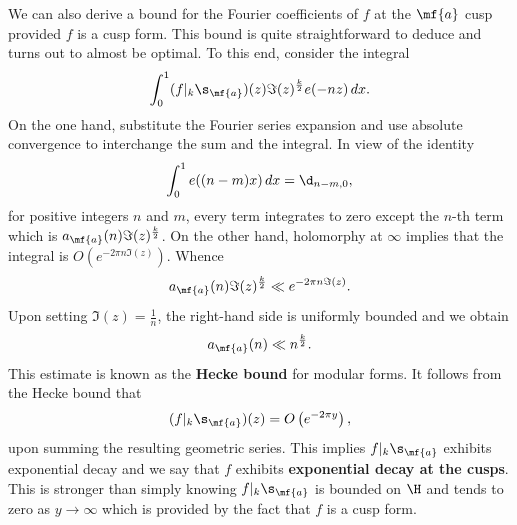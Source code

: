 \documentclass[12pt]{article}
\begin{document}
      We can also derive a bound for the Fourier coefficients of \(f\) at the \(\mf{a}\) cusp provided \(f\) is a cusp form. This bound is quite straightforward to deduce and turns out to almost be optimal. To this end, consider the integral
      \[
        \int_{0}^{1}(f|_{k}\s_{\mf{a}})(z)\Im(z)^{\frac{k}{2}}e(-nz)\,dx.
      \]
      On the one hand, substitute the Fourier series expansion and use absolute convergence to interchange the sum and the integral. In view of the identity
      \begin{equation}\label{equ:Dirac_integral_representation}
        \int_{0}^{1}e((n-m)x)\,dx = \d_{n-m,0},
      \end{equation}
      for positive integers \(n\) and \(m\), every term integrates to zero except the \(n\)-th term which is \(a_{\mf{a}}(n)\Im(z)^{\frac{k}{2}}\). On the other hand, holomorphy at \(\infty\) implies that the integral is \(O\left(e^{-2\pi n\Im(z)}\right)\). Whence
      \[
        a_{\mf{a}}(n)\Im(z)^{\frac{k}{2}} \ll e^{-2\pi n\Im(z)}.
      \]
      Upon setting \(\Im(z) = \frac{1}{n}\), the right-hand side is uniformly bounded and we obtain
      \[
        a_{\mf{a}}(n) \ll n^{\frac{k}{2}}.
      \]
      This estimate is known as the \textbf{Hecke bound} for modular forms. It follows from the Hecke bound that
      \[
        (f|_{k}\s_{\mf{a}})(z) = O\left(e^{-2\pi y}\right),
      \]
      upon summing the resulting geometric series. This implies \(f|_{k}\s_{\mf{a}}\) exhibits exponential decay and we say that \(f\) exhibits \textbf{exponential decay at the cusps}. This is stronger than simply knowing \(f|_{k}\s_{\mf{a}}\) is bounded on \(\H\) and tends to zero as \(y \to \infty\) which is provided by the fact that \(f\) is a cusp form.
\end{document}
